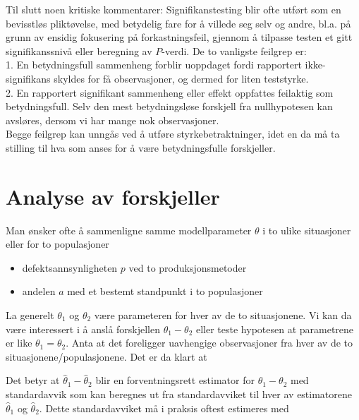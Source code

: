 Til slutt noen kritiske kommentarer: Signifikanstesting blir ofte
utført som en bevisstløs pliktøvelse, med betydelig fare for å
villede seg selv og andre, bl.a. på grunn av ensidig
fokusering på forkastningsfeil, gjennom å tilpasse testen et
gitt signifikanssnivå eller beregning av $P$-verdi. De to
vanligste feilgrep er:\\
1. En betydningsfull sammenheng forblir
uoppdaget fordi rapportert ikke-signifikans skyldes
for få observasjoner, og dermed for liten teststyrke.\\
2. En rapportert signifikant sammenheng eller effekt oppfattes
feilaktig som betydningsfull. Selv den mest betydningsløse
forskjell fra nullhypotesen kan avsløres, dersom vi har mange nok
observasjoner.\\
 Begge feilgrep kan unngås ved å utføre
styrkebetraktninger, idet en da må ta stilling til hva som anses
for å være betydningsfulle forskjeller.

\section{Analyse av forskjeller}
Man ønsker ofte å sammenligne samme modellparameter $\theta$ i
to ulike si\-tua\-sjoner eller for to populasjoner
\begin{itemize}
\item  defektsannsynligheten $p$ ved to produksjonsmetoder
\item  andelen $a$ med et bestemt standpunkt i to populasjoner
\end{itemize}
La generelt ${\theta}_1$ og ${\theta}_2$ være parameteren for hver 
av de to situasjonene.  Vi kan da være interessert i å anslå
forskjellen ${\theta}_1 - {\theta}_2$ eller teste hypotesen at 
parametrene er like ${\theta}_1 = {\theta}_2$.  Anta at det foreligger 
uavhengige observasjoner fra hver av de to situasjonene/populasjonene.
Det er da klart at

\begin{center}  \end{center}
Det betyr at ${\hat{\theta}}_1 - {\hat{\theta}}_2$ blir en 
forventningsrett estimator for ${\theta}_1 - {\theta}_2$ med 
standardavvik som kan beregnes ut fra standardavviket til hver av
estimatorene ${\hat{\theta}}_1$ og ${\hat{\theta}}_2$.
Dette standardavviket må i praksis oftest estimeres med 

